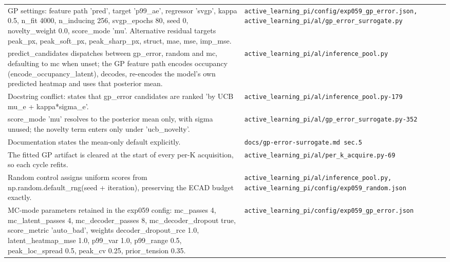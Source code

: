 \begin{longtable}{p{} p{}}
GP settings: feature path 'pred', target 'p99\_ae', regressor 'svgp', kappa 0.5, n\_fit 4000, n\_inducing 256, svgp\_epochs 80, seed 0, novelty\_weight 0.0, score\_mode 'mu'. Alternative residual targets peak\_px, peak\_soft\_px, peak\_sharp\_px, struct, mae, mse, imp\_mse. & \texttt{active\_\allowbreak{}learning\_\allowbreak{}pi/\allowbreak{}config/\allowbreak{}exp059\_\allowbreak{}gp\_\allowbreak{}error.json, active\_\allowbreak{}learning\_\allowbreak{}pi/\allowbreak{}al/\allowbreak{}gp\_\allowbreak{}error\_\allowbreak{}surrogate.py} \\
predict\_candidates dispatches between gp\_error, random and mc, defaulting to mc when unset; the GP feature path encodes occupancy (encode\_occupancy\_latent), decodes, re-encodes the model's own predicted heatmap and uses that posterior mean. & \texttt{active\_\allowbreak{}learning\_\allowbreak{}pi/\allowbreak{}al/\allowbreak{}inference\_\allowbreak{}pool.py} \\
Docstring conflict: states that gp\_error candidates are ranked 'by UCB mu\_e + kappa*sigma\_e'. & \texttt{active\_\allowbreak{}learning\_\allowbreak{}pi/\allowbreak{}al/\allowbreak{}inference\_\allowbreak{}pool.py-179} \\
score\_mode 'mu' resolves to the posterior mean only, with sigma unused; the novelty term enters only under 'ucb\_novelty'. & \texttt{active\_\allowbreak{}learning\_\allowbreak{}pi/\allowbreak{}al/\allowbreak{}gp\_\allowbreak{}error\_\allowbreak{}surrogate.py-352} \\
Documentation states the mean-only default explicitly. & \texttt{docs/\allowbreak{}gp-error-surrogate.md sec.5} \\
The fitted GP artifact is cleared at the start of every per-K acquisition, so each cycle refits. & \texttt{active\_\allowbreak{}learning\_\allowbreak{}pi/\allowbreak{}al/\allowbreak{}per\_\allowbreak{}k\_\allowbreak{}acquire.py-69} \\
Random control assigns uniform scores from np.random.default\_rng(seed + iteration), preserving the ECAD budget exactly. & \texttt{active\_\allowbreak{}learning\_\allowbreak{}pi/\allowbreak{}al/\allowbreak{}inference\_\allowbreak{}pool.py, active\_\allowbreak{}learning\_\allowbreak{}pi/\allowbreak{}config/\allowbreak{}exp059\_\allowbreak{}random.json} \\
MC-mode parameters retained in the exp059 config: mc\_passes 4, mc\_latent\_passes 4, mc\_decoder\_passes 8, mc\_decoder\_dropout true, score\_metric 'auto\_bad', weights decoder\_dropout\_rce 1.0, latent\_heatmap\_mse 1.0, p99\_var 1.0, p99\_range 0.5, peak\_loc\_spread 0.5, peak\_cv 0.25, prior\_tension 0.35. & \texttt{active\_\allowbreak{}learning\_\allowbreak{}pi/\allowbreak{}config/\allowbreak{}exp059\_\allowbreak{}gp\_\allowbreak{}error.json} \\

\end{longtable}
